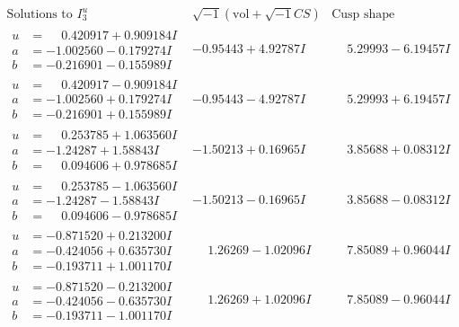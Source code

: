 \documentclass[1p]{elsarticle_modified}
\theoremstyle{definition}
\newcommand{\I}{\sqrt{-1}}
\begin{document}
$$\begin{array}{c|c|c}  
\text{Solutions to }I^u_{3}& \I (\text{vol} + \sqrt{-1}CS) & \text{Cusp shape}\\
 \hline 
\begin{aligned}
u &= \phantom{-}0.420917 + 0.909184 I \\
a &= -1.002560 - 0.179274 I \\
b &= -0.216901 - 0.155989 I\end{aligned}
 & -0.95443 + 4.92787 I & \phantom{-}5.29993 - 6.19457 I \\ \hline\begin{aligned}
u &= \phantom{-}0.420917 - 0.909184 I \\
a &= -1.002560 + 0.179274 I \\
b &= -0.216901 + 0.155989 I\end{aligned}
 & -0.95443 - 4.92787 I & \phantom{-}5.29993 + 6.19457 I \\ \hline\begin{aligned}
u &= \phantom{-}0.253785 + 1.063560 I \\
a &= -1.24287 + 1.58843 I \\
b &= \phantom{-}0.094606 + 0.978685 I\end{aligned}
 & -1.50213 + 0.16965 I & \phantom{-}3.85688 + 0.08312 I \\ \hline\begin{aligned}
u &= \phantom{-}0.253785 - 1.063560 I \\
a &= -1.24287 - 1.58843 I \\
b &= \phantom{-}0.094606 - 0.978685 I\end{aligned}
 & -1.50213 - 0.16965 I & \phantom{-}3.85688 - 0.08312 I \\ \hline\begin{aligned}
u &= -0.871520 + 0.213200 I \\
a &= -0.424056 + 0.635730 I \\
b &= -0.193711 + 1.001170 I\end{aligned}
 & \phantom{-}1.26269 - 1.02096 I & \phantom{-}7.85089 + 0.96044 I \\ \hline\begin{aligned}
u &= -0.871520 - 0.213200 I \\
a &= -0.424056 - 0.635730 I \\
b &= -0.193711 - 1.001170 I\end{aligned}
 & \phantom{-}1.26269 + 1.02096 I & \phantom{-}7.85089 - 0.96044 I \\ \hline\begin{aligned}

\end{aligned}
\end{array}$$
\end{document}
